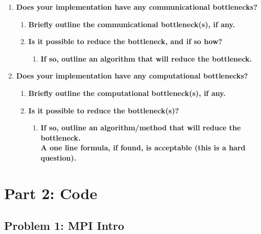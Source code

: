 \begin{enumerate}

\item \textbf{Does your implementation have any communicational bottlenecks?}

\begin{enumerate}

\item \textbf{Briefly outline the communicational bottleneck(s), if any.}

\item \textbf{Is it possible to reduce the bottleneck, and if so how?}

\begin{enumerate}

\item \textbf{If so, outline an algorithm that will reduce the bottleneck.}

\end{enumerate}

\end{enumerate}

\item \textbf{Does your implementation have any computational bottlenecks?}

\begin{enumerate}

\item \textbf{Briefly outline the computational bottleneck(s), if any.}

\item \textbf{Is it possible to reduce the bottleneck(s)?}

\begin{enumerate}

\item \textbf{If so, outline an algorithm/method that will reduce the bottleneck.\\A one line formula, if found, is acceptable (this is a hard question).}

\end{enumerate}

\end{enumerate}

\end{enumerate}

\section*{Part 2: Code}

\subsection*{Problem 1: MPI Intro}

